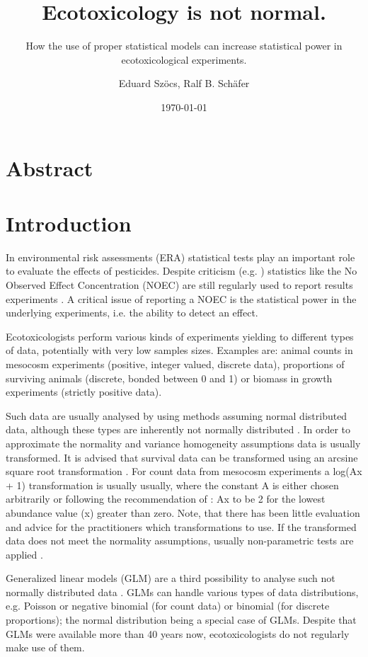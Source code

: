 \documentclass{scrartcl}
\title{Ecotoxicology is not normal.}
\subtitle{How the use of proper statistical models can increase statistical power in ecotoxicological experiments.}
\author{Eduard Szöcs, Ralf B. Schäfer}
\date{\today}
\begin{document}
\maketitle

\section*{Abstract}


\section{Introduction}
In environmental risk assessments (ERA) statistical tests play an important role to evaluate the effects of pesticides. 
Despite criticism (e.g. \citet{landis_well_2011}) statistics like the No Observed Effect Concentration (NOEC) are still regularly used to report results experiments \citep{jager_bad_2012}. 
A critical issue of reporting a NOEC is the statistical power in the underlying experiments, i.e. the ability to detect an effect.

Ecotoxicologists perform various kinds of experiments yielding to different types of data, potentially with very low samples sizes. 
Examples are: animal counts in mesocosm experiments (positive, integer valued, discrete data), proportions of surviving animals (discrete, bonded between 0 and 1) or biomass in growth experiments (strictly positive data).

Such data are usually analysed by using methods assuming normal distributed data, although these types are inherently not normally distributed \citep{wang_making_2011}. 
In order to approximate the normality and variance homogeneity assumptions data is usually transformed.
It is advised that survival data can be transformed using an arcsine square root transformation \citep{oecd_current_2006, newman_quantitative_2012}. 
For count data from mesocosm experiments a log(Ax + 1) transformation is usually usually, where the constant A is either chosen arbitrarily or following the recommendation of \citet{van_den_brink_impact_2000}: Ax to be 2 for the lowest abundance value (x) greater than zero. 
Note, that there has been little evaluation and advice for the practitioners which transformations to use.
If the transformed data does not meet the normality assumptions, usually non-parametric tests are applied \citep{wang_making_2011}.

Generalized linear models (GLM) are a third possibility to analyse such not normally distributed data \citep{nelder_generalized_1972}.
GLMs can handle various types of data distributions, e.g. Poisson or negative binomial (for count data) or binomial (for discrete proportions); the normal distribution being a special case of GLMs.
Despite that GLMs were available more than 40 years now, ecotoxicologists do not regularly make use of them.
\end{document}
